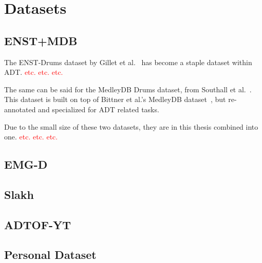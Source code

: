 \chapter{Datasets}

\section{ENST+MDB}

The ENST-Drums dataset by Gillet et al.~\cite{gillet_2006_7432188} has become a staple dataset within \gls{ADT}. \textcolor{red}{etc. etc. etc.}

The same can be said for the MedleyDB Drums dataset, from Southall et al.~\cite{southall2017mdb}. This dataset is built on top of Bittner et al.'s MedleyDB dataset~\cite{rachel_bittner_2014_1438309}, but re-annotated and specialized for \gls{ADT} related tasks.

Due to the small size of these two datasets, they are in this thesis combined into one. \textcolor{red}{etc. etc. etc.}

\section{EMG-D}

\section{Slakh}

\section{ADTOF-YT}

\section{Personal Dataset}